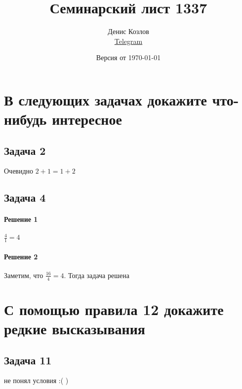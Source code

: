 \documentclass[a4paper]{article}
\title{Семинарский лист 1337}
\author{
    Денис Козлов       \\ \href{https://t.me/DKozl50}{Telegram}
}
\date{Версия от {\ddmmyyyydate\today} \currenttime}
\begin{document}
    \maketitle
    
    \section*{В следующих задачах докажите что-нибудь интересное}


    \subsection*{Задача 2}
    Очевидно $2 + 1 = 1 + 2$


    \subsection*{Задача 4}
    \paragraph*{Решение 1}
    $\frac{4}{1} = 4$ 

    \paragraph*{Решение 2}
    Заметим, что $\frac{16}{4} = 4$. Тогда задача решена





    \section*{С помощью правила 12 докажите редкие высказывания}


    \subsection*{Задача 11}
    не понял условия :( )




\end{document}
